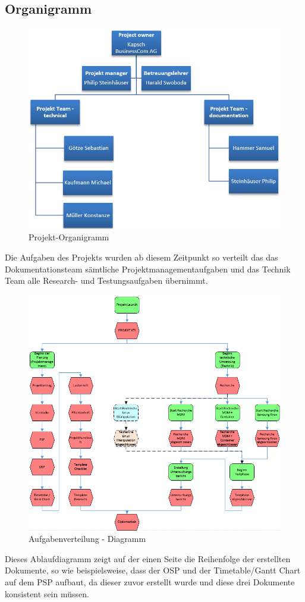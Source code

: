 \subsection{Organigramm}
\begin{figure}[H]
	\includegraphics[scale=0.6]{Images/organigramm}
	\caption{Projekt-Organigramm}
\end{figure}
Die Aufgaben des Projekts wurden ab diesem Zeitpunkt so verteilt das das Dokumentationsteam sämtliche Projektmanagementaufgaben und das Technik Team alle Research- und Testungsaufgaben übernimmt.
\begin{figure}[H]
	\includegraphics[scale=0.7]{Images/arbeitsteilung}
	\caption{Aufgabenverteilung - Diagramm}
\end{figure}
Dieses Ablaufdiagramm zeigt auf der einen Seite die Reihenfolge der erstellten Dokumente, so wie beispielsweise, dass der OSP und der Timetable/Gantt Chart auf dem PSP aufbaut, da dieser zuvor erstellt wurde und diese drei Dokumente konsistent sein müssen.
